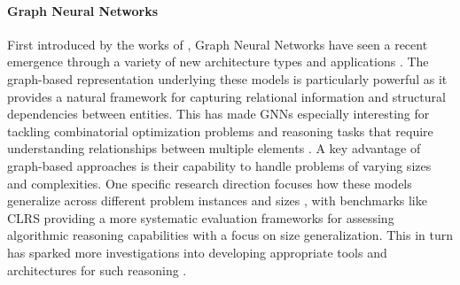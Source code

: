 \paragraph{Graph Neural Networks} First introduced by the works of \citet{scarselli2008graph}, Graph Neural Networks have seen a recent emergence through a variety of new architecture types and applications \cite{kipf2017semisupervisedclassificationgraphconvolutional, xu2019powerfulgraphneuralnetworks, veličković2018graphattentionnetworks}. The graph-based representation underlying these models is particularly powerful as it provides a natural framework for capturing relational information and structural dependencies between entities. This has made GNNs especially interesting for tackling combinatorial optimization problems \cite{dai2018learningcombinatorialoptimizationalgorithms, cappart2022combinatorialoptimizationreasoninggraph, anycsp} and reasoning tasks that require understanding relationships between multiple elements \cite{battaglia2018relationalinductivebiasesdeep}. A key advantage of graph-based approaches is their capability to handle problems of varying sizes and complexities. One specific research direction focuses how these models generalize across different problem instances and sizes \cite{xu2021neuralnetworksextrapolatefeedforward, schwarzschild2021learnalgorithmgeneralizingeasy}, with benchmarks like CLRS \cite{Velickovic2022} providing a more systematic evaluation frameworks for assessing algorithmic reasoning capabilities with a focus on size generalization. This in turn has sparked more investigations into developing appropriate tools and architectures for such reasoning \cite{ibarz2022generalistneuralalgorithmiclearner,numeroso2023dualalgorithmicreasoning,minder2023salsaclrssparsescalablebenchmark,mahdavitowards,bohde2024markovpropertyneuralalgorithmic,müller2024principledgraphtransformers}.